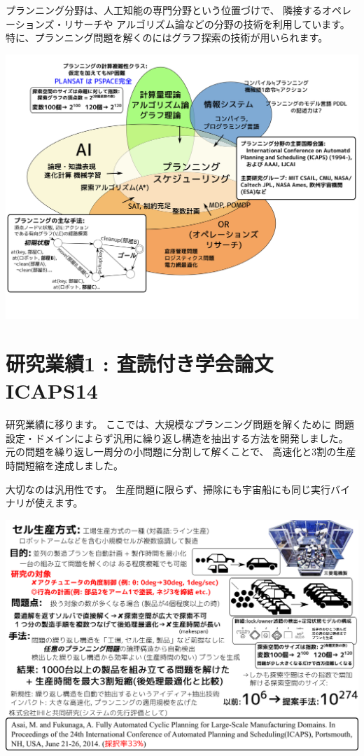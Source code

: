 \begin{resume}
プランニング分野は、人工知能の専門分野という位置づけで、
隣接するオペレーションズ・リサーチや
アルゴリズム論などの分野の技術を利用しています。
特に、プランニング問題を解くのにはグラフ探索の技術が用いられます。
\end{resume}

\includegraphics{img/planning2.png}

\section{研究業績1 : 査読付き学会論文 ICAPS14}
\label{sec-3}

\begin{resume}
研究業績に移ります。
ここでは、大規模なプランニング問題を解くために
問題設定・ドメインによらず汎用に繰り返し構造を抽出する方法を開発しました。
元の問題を繰り返し一周分の小問題に分割して解くことで、
高速化と3割の生産時間短縮を達成しました。

大切なのは汎用性です。
生産問題に限らず、掃除にも宇宙船にも同じ実行バイナリが使えます。
\end{resume}

\includegraphics{img/assemble-icaps14.png}

